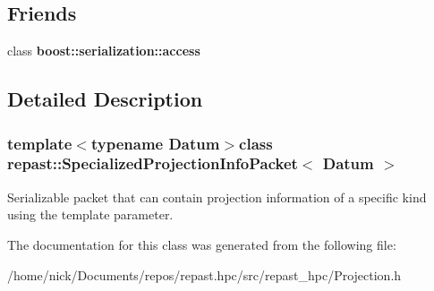 \subsection*{Friends}
\begin{DoxyCompactItemize}
\item 
\hypertarget{classrepast_1_1_specialized_projection_info_packet_ac98d07dd8f7b70e16ccb9a01abf56b9c}{class {\bfseries boost\-::serialization\-::access}}\label{classrepast_1_1_specialized_projection_info_packet_ac98d07dd8f7b70e16ccb9a01abf56b9c}

\end{DoxyCompactItemize}


\subsection{Detailed Description}
\subsubsection*{template$<$typename Datum$>$class repast\-::\-Specialized\-Projection\-Info\-Packet$<$ Datum $>$}

Serializable packet that can contain projection information of a specific kind using the template parameter. 

The documentation for this class was generated from the following file\-:\begin{DoxyCompactItemize}
\item 
/home/nick/\-Documents/repos/repast.\-hpc/src/repast\-\_\-hpc/Projection.\-h\end{DoxyCompactItemize}
